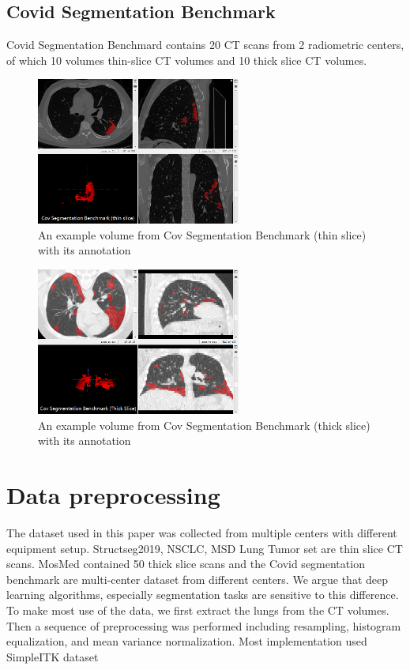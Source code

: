 \subsection{Covid Segmentation Benchmark}
Covid Segmentation Benchmard contains 20 CT scans from 2 radiometric centers, of which 10 volumes thin-slice CT volumes and 10 thick slice CT volumes.
\begin{figure}[h]
	\centering
	\includegraphics[width=0.6\textwidth]{img/Dataset/Cov_benchmark_thin}
	\caption{An example volume from Cov Segmentation Benchmark (thin slice) with its annotation}
	\label{fig:Covseg_thin}
\end{figure}
\begin{figure}[h]
	\centering
	\includegraphics[width=0.6\textwidth]{img/Dataset/Cov_benchmark_thick}
	\caption{An example volume from Cov Segmentation Benchmark (thick slice) with its annotation}
	\label{fig:Covseg_thick}
\end{figure}


\section{Data preprocessing}
The dataset used in this paper was collected from multiple centers with different equipment setup. Structseg2019, NSCLC, MSD Lung Tumor set are thin slice CT scans. MosMed contained 50 thick slice scans and the Covid segmentation benchmark are multi-center dataset from different centers. We argue that deep learning algorithms, especially segmentation tasks are sensitive to this difference. To make most use of the data, we first extract the lungs from the CT volumes. Then a sequence of preprocessing was performed including resampling, histogram equalization, and mean variance normalization. Most implementation used SimpleITK dataset
